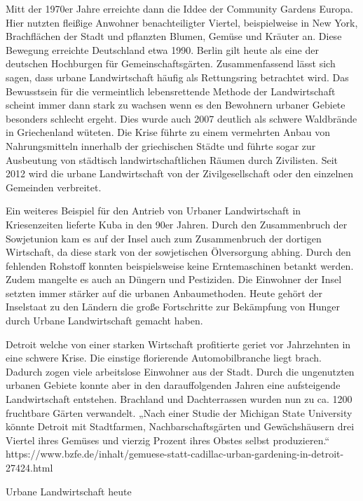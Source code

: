 \documentclass{scrartcl}
\begin{document}
Mitt der 1970er Jahre erreichte dann die Iddee der Community Gardens Europa. Hier nutzten fleißige Anwohner benachteiligter Viertel, beispielweise in New York, Brachflächen der Stadt und pflanzten Blumen, Gemüse und Kräuter an. Diese Bewegung erreichte Deutschland etwa 1990. Berlin gilt heute als eine der deutschen Hochburgen für Gemeinschaftsgärten. Zusammenfassend lässt sich sagen, dass urbane Landwirtschaft häufig als Rettungsring betrachtet wird. Das Bewusstsein für die vermeintlich lebensrettende Methode der Landwirtschaft scheint immer dann stark zu wachsen wenn es den Bewohnern urbaner Gebiete besonders schlecht ergeht. Dies wurde auch 2007 deutlich als schwere Waldbrände in Griechenland wüteten. Die Krise führte zu einem vermehrten Anbau von Nahrungsmitteln innerhalb der griechischen Städte und führte sogar zur Ausbeutung von städtisch landwirtschaftlichen Räumen durch Zivilisten. Seit 2012 wird die urbane Landwirtschaft von der Zivilgesellschaft oder den einzelnen Gemeinden verbreitet.

Ein weiteres Beispiel für den Antrieb von Urbaner Landwirtschaft in Kriesenzeiten lieferte Kuba in den 90er Jahren. Durch den Zusammenbruch der Sowjetunion kam es auf der Insel auch zum Zusammenbruch der dortigen Wirtschaft, da diese stark von der sowjetischen Ölversorgung abhing. Durch den fehlenden Rohstoff konnten beispielsweise keine Erntemaschinen betankt werden. Zudem mangelte es auch an Düngern und Pestiziden. Die Einwohner der Insel setzten immer stärker auf die urbanen Anbaumethoden. Heute gehört der Inselstaat zu den Ländern die große Fortschritte zur Bekämpfung von Hunger durch Urbane Landwirtschaft gemacht haben.

Detroit welche von einer starken Wirtschaft profitierte geriet vor Jahrzehnten in eine schwere Krise. Die einstige florierende Automobilbranche liegt brach. Dadurch zogen viele arbeitslose Einwohner aus der Stadt. Durch die ungenutzten urbanen Gebiete konnte aber in den darauffolgenden Jahren eine aufsteigende Landwirtschaft entstehen. Brachland und Dachterrassen wurden nun zu ca. 1200 fruchtbare Gärten verwandelt. „Nach einer Studie der Michigan State University könnte Detroit mit Stadtfarmen, Nachbarschaftsgärten und Gewächshäusern drei Viertel ihres Gemüses und vierzig Prozent ihres Obstes selbst produzieren.“ https://www.bzfe.de/inhalt/gemuese-statt-cadillac-urban-gardening-in-detroit-27424.html

Urbane Landwirtschaft heute
\end{document}
